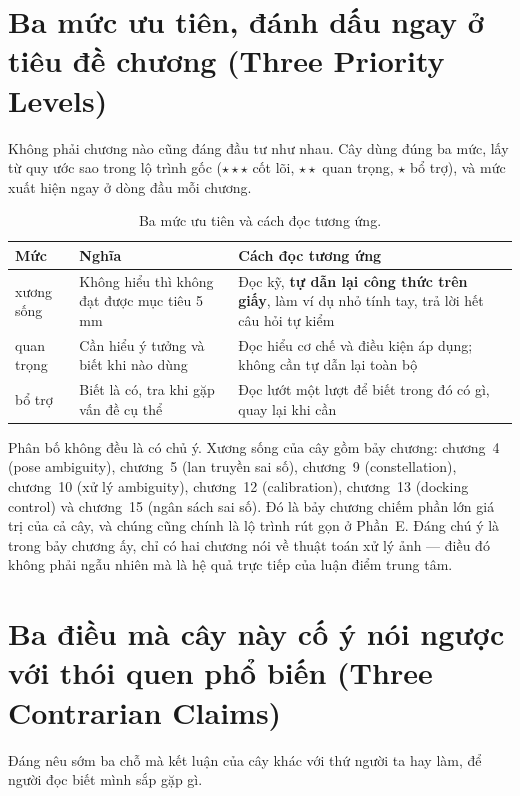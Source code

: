 \documentclass[marker.tex]{subfiles}
\begin{document}
\section*{Ba mức ưu tiên, đánh dấu ngay ở tiêu đề chương (Three Priority Levels)}

Không phải chương nào cũng đáng đầu tư như nhau. Cây dùng đúng ba mức, lấy từ quy ước sao trong lộ trình gốc (\(\star\star\star\) cốt lõi, \(\star\star\) quan trọng, \(\star\) bổ trợ), và mức xuất hiện ngay ở dòng đầu mỗi chương.

\begin{table}[H]\centering\small
\caption{Ba mức ưu tiên và cách đọc tương ứng.}
\label{tab:ba-muc}
\begin{tabularx}{\linewidth}{@{}L{2.0cm}L{4.3cm}Y@{}}
\toprule
\textbf{Mức} & \textbf{Nghĩa} & \textbf{Cách đọc tương ứng}\\
\midrule
{} xương sống & Không hiểu thì không đạt được mục tiêu 5\,mm & Đọc kỹ, \textbf{tự dẫn lại công thức trên giấy}, làm ví dụ nhỏ tính tay, trả lời hết câu hỏi tự kiểm\\
 quan trọng & Cần hiểu ý tưởng và biết khi nào dùng & Đọc hiểu cơ chế và điều kiện áp dụng; không cần tự dẫn lại toàn bộ\\
 bổ trợ & Biết là có, tra khi gặp vấn đề cụ thể & Đọc lướt một lượt để biết trong đó có gì, quay lại khi cần\\
\bottomrule
\end{tabularx}
\end{table}

Phân bố không đều là có chủ ý. Xương sống của cây gồm bảy chương: chương~4 (pose ambiguity), chương~5 (lan truyền sai số), chương~9 (constellation), chương~10 (xử lý ambiguity), chương~12 (calibration), chương~13 (docking control) và chương~15 (ngân sách sai số). Đó là bảy chương chiếm phần lớn giá trị của cả cây, và chúng cũng chính là lộ trình rút gọn ở Phần~E. Đáng chú ý là trong bảy chương ấy, chỉ có hai chương nói về thuật toán xử lý ảnh --- điều đó không phải ngẫu nhiên mà là hệ quả trực tiếp của luận điểm trung tâm.

\section*{Ba điều mà cây này cố ý nói ngược với thói quen phổ biến (Three Contrarian Claims)}

Đáng nêu sớm ba chỗ mà kết luận của cây khác với thứ người ta hay làm, để người đọc biết mình sắp gặp gì.
\end{document}
